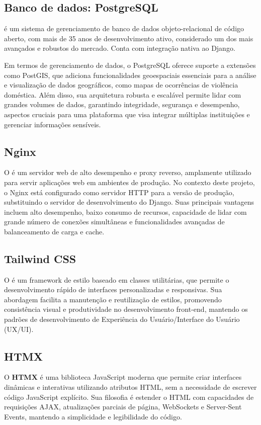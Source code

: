 \subsection{Banco de dados: PostgreSQL}
\par {} é um sistema de gerenciamento de banco de dados objeto-relacional de código aberto, com mais de 35 anos de desenvolvimento ativo, considerado um dos mais avançados e robustos do mercado. Conta com integração nativa ao Django.
\par Em termos de gerenciamento de dados, o PostgreSQL oferece suporte a extensões como PostGIS, que adiciona funcionalidades geoespaciais essenciais para a análise e visualização de dados geográficos, como mapas de ocorrências de violência doméstica. Além disso, sua arquitetura robusta e escalável permite lidar com grandes volumes de dados, garantindo integridade, segurança e desempenho, aspectos cruciais para uma plataforma que visa integrar múltiplas instituições e gerenciar informações sensíveis.

\subsection{Nginx}
\par O  é um servidor web de alto desempenho e proxy reverso, amplamente utilizado para servir aplicações web em ambientes de produção. No contexto deste projeto, o Nginx está configurado como servidor HTTP para a versão de produção, substituindo o servidor de desenvolvimento do Django. Suas principais vantagens incluem alto desempenho, baixo consumo de recursos, capacidade de lidar com grande número de conexões simultâneas e funcionalidades avançadas de balanceamento de carga e cache.

\subsection{Tailwind CSS}
\par O  é um framework de estilo baseado em classes utilitárias, que permite o desenvolvimento rápido de interfaces personalizadas e responsivas. Sua abordagem facilita a manutenção e reutilização de estilos, promovendo consistência visual e produtividade no desenvolvimento front-end, mantendo os padrões de desenvolvimento de Experiência do Usuário/Interface do Usuário (UX/UI).

\subsection{HTMX}
\par O \textbf{HTMX} \cite{htmx:2026} é uma biblioteca JavaScript moderna que permite criar interfaces dinâmicas e interativas utilizando atributos HTML, sem a necessidade de escrever código JavaScript explícito. Sua filosofia é estender o HTML com capacidades de requisições AJAX, atualizações parciais de página, WebSockets e Server-Sent Events, mantendo a simplicidade e legibilidade do código.

